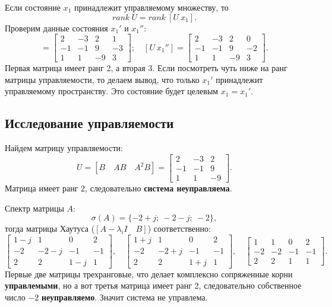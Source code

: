 Если состояние $x_1$ принадлежит управляемому множеству, то
\begin{equation*}
    rank\ U=rank\ [U\ x_1].
\end{equation*}
Проверим данные состояния $x_1'$ и $x_1''$:
\begin{equation*}
    [U\ x_1']=
    \begin{bmatrix}
        2 & -3 & 2 & 1\\
        -1 & -1 & 9 & -3\\
        1 & 1 & -9 & 3
    \end{bmatrix};\quad
    [U\ x_1'']=
    \begin{bmatrix}
        2 & -3 & 2 & 0\\
        -1 & -1 & 9 & -2\\
        1 & 1 & -9 & 3
    \end{bmatrix}.
\end{equation*}
Первая матрица имеет ранг 2, а вторая 3. Если посмотреть чуть ниже на ранг матрицы управляемости,
то делаем вывод, что только $x_1'$ принадлежит управляемому пространству. Это состояние будет
целевым $x_1=x_1'$.

\subsection{Исследование управляемости}

Найдем матрицу управляемости:
\begin{equation*}
    U=[B\quad AB\quad A^2B]=
    \begin{bmatrix}
        2 & -3 & 2 \\ -1 & -1 & 9 \\ 1 & 1 & -9
    \end{bmatrix}.
\end{equation*}
Матрица имеет ранг 2, следовательно \textbf{система неуправляема}.

Спектр матрицы $A$:
$$\sigma(A)=\{ -2 + j;\ -2-j;\ -2\},$$
тогда матрицы Хаутуса ($[A-\lambda_iI\quad B]$) соответственно:
\begin{equation*}
    \begin{bmatrix}
        1-j&1&0&2\\
        -2&-2-j&-1&-1\\
        2&2&1-j&1
    \end{bmatrix},\quad 
    \begin{bmatrix}
        1+j&1&0&2\\-2&-2+j&-1&-1\\2&2&1+j&1
    \end{bmatrix},\quad
    \begin{bmatrix}
        1 & 1 & 0 & 2 \\
        -2 & -2 & -1 & -1 \\
        2 & 2 & 1 & 1
    \end{bmatrix}.
\end{equation*}
Первые две матрицы трехранговые, что делает комплексно сопряженные корни
\textbf{управлемыми}, но а вот третья матрица имеет ранг 2, следовательно собственное
число $-2$ \textbf{неуправляемо}. Значит система не управлема.

